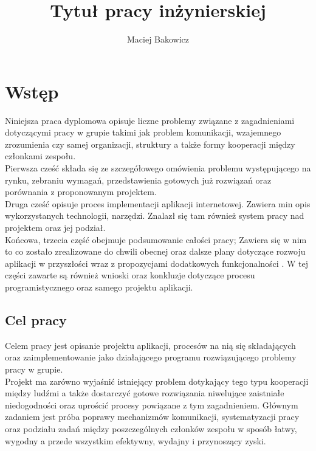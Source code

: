 \documentclass[eng,printmode]{mgr}
\title{Tytuł pracy inżynierskiej}
\author{Maciej Bakowicz}
\begin{document}


\maketitle 

\tableofcontents 

\chapter{Wstęp}  
Niniejsza praca dyplomowa opisuje liczne problemy związane z zagadnieniami dotyczącymi pracy w grupie takimi jak problem komunikacji, wzajemnego zrozumienia czy samej organizacji, struktury a także formy kooperacji między członkami zespołu.
\\
Pierwsza cześć składa się ze szczegółowego omówienia problemu występującego na rynku, zebraniu wymagań, przedstawienia gotowych już rozwiązań oraz porównania z proponowanym projektem.
\\
Druga cześć opisuje proces implementacji aplikacji internetowej. Zawiera min opis wykorzystanych technologii, narzędzi. Znalazł się tam również system pracy nad projektem oraz jej podział.
\\
Końcowa, trzecia część obejmuje podsumowanie całości pracy; Zawiera się w nim to co zostało zrealizowane do chwili obecnej oraz dalsze plany dotyczące rozwoju aplikacji w przyszłości wraz z propozycjami dodatkowych funkcjonalności . W tej części zawarte są również wnioski oraz konkluzje dotyczące procesu programistycznego oraz samego projektu aplikacji. \cite{Node.js}

\section{Cel pracy}
Celem pracy jest opisanie projektu aplikacji, procesów na nią się składających oraz zaimplementowanie jako działającego programu rozwiązującego problemy pracy w grupie.
\\
Projekt ma zarówno wyjaśnić istniejący problem dotykający tego typu kooperacji między ludźmi a także dostarczyć gotowe rozwiązania niwelujące zaistniałe niedogodności oraz uprościć procesy powiązane z tym zagadnieniem. Głównym zadaniem jest próba poprawy mechanizmów komunikacji, systematyzacji pracy oraz podziału zadań między poszczególnych członków zespołu w sposób łatwy, wygodny a przede wszystkim efektywny, wydajny i przynoszący zyski.
\end{document}
